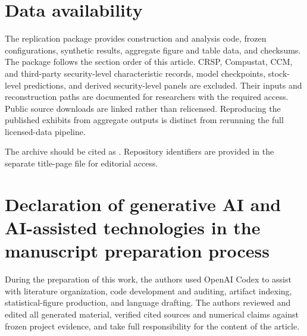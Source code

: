 \documentclass[preprint,12pt,authoryear]{elsarticle}
\begin{document}
\section*{Data availability}
The replication package provides construction and analysis code, frozen configurations, synthetic results, aggregate figure and table data, and checksums. The package follows the section order of this article. CRSP, Compustat, CCM, and third-party security-level characteristic records, model checkpoints, stock-level predictions, and derived security-level panels are excluded. Their inputs and reconstruction paths are documented for researchers with the required access. Public source downloads are linked rather than relicensed. Reproducing the published exhibits from aggregate outputs is distinct from rerunning the full licensed-data pipeline.
\ifdefined\IRFAAUTHORED

The archive should be cited as \citet{wang2026replication}.
\else
Repository identifiers are provided in the separate title-page file for editorial access.
\fi

\ifdefined\IRFAAUTHORED

\fi

\section*{Declaration of generative AI and AI-assisted technologies in the manuscript preparation process}
During the preparation of this work, the authors used OpenAI Codex to assist with literature organization, code development and auditing, artifact indexing, statistical-figure production, and language drafting. The authors reviewed and edited all generated material, verified cited sources and numerical claims against frozen project evidence, and take full responsibility for the content of the article.

\begingroup
\small
\setlength{\bibsep}{3pt}


\endgroup
\end{document}
